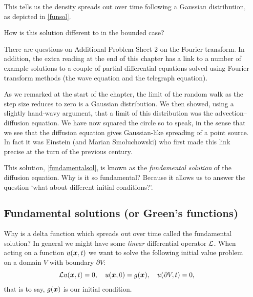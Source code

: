 \documentclass[main.tex]{subfiles}
\begin{document}
This tells us the density spreads out over time following a Gaussian distribution, as depicted in \cref{funsol}.

\begin{do-it-yourself}
	How is this solution different to in the bounded case?
\end{do-it-yourself}
\begin{do-it-yourself}
There are questions on Additional Problem Sheet 2 on the Fourier transform. In addition, the extra reading at the end of this chapter has a link to a number of example solutions to a couple of partial differential equations solved using Fourier transform methods (the wave equation and the telegraph equation).
\end{do-it-yourself}

As we remarked at the start of the chapter, the limit of the random walk as the step size reduces to zero is a Gaussian distribution. We then showed, using a slightly hand-wavy argument, that a limit of this distribution was the advection--diffusion equation. We have now squared the circle so to speak, in the sense that we see that the diffusion equation gives Gaussian-like spreading of a point source. In fact it was Einstein (and Marian Smoluchowski) who first made this link precise at the turn of the previous century.

This solution, \cref{fundamentalsol}, is known as the \emph{fundamental solution} of the diffusion equation. Why is it so fundamental? Because it allows us to answer the question `what about different initial conditions?'.

\subsection{Fundamental solutions (or Green's functions)}
Why is a delta function which spreads out over time called the fundamental solution? In general we might have some \emph{linear} differential operator $\mathcal{L}$. When acting on a function $u(\v{x},t)$ we want to solve the following initial value problem on a domain $V$ with boundary $\partial V$:
\begin{equation}
\label{fullprob}
\Lin u(\v{x},t) =  0,\quad u(\v{x},0) = g(\v{x}),\quad u(\partial{V},t) = 0,
\end{equation}
that is to say, $g(\v{x})$ is our initial condition. 
\end{document}
